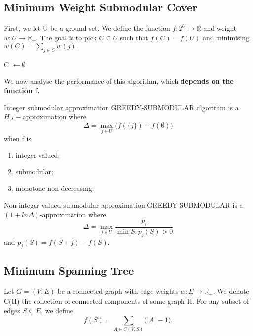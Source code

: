 \documentclass[twoside]{article}
\begin{document}
\subsection{Minimum Weight Submodular Cover}
First, we let U be a ground set. We define the function $f: 2^U \rightarrow \mathbb{R}$ and weight $w: U \rightarrow \mathbb{R}_{+}$. The goal is to pick $C \subseteq U$ such that $f(C) = f(U)$ and minimising $w(C) = \sum_{j \in C}w(j).$
\begin{algorithm}
\DontPrintSemicolon
{}
C $\gets \emptyset$\;

\;
\caption{{\sc GREEDY SUBMODULAR Algorithm}}
\label{algo:duplicate}
\end{algorithm}

We now analyse the performance of this algorithm, which \textbf{depends on the function f.}

\begin{theorem_exam}{Integer submodular approximation}{} GREEDY-SUBMODULAR algorithm is a $H_{\Delta}-$approximation where 
$$
\Delta = \max_{j \in U}\bigg(f(\{j\}) - f(\emptyset) \bigg)
$$
when f is 
\begin{enumerate}
\item integer-valued;
\item submodular;
\item monotone non-decreasing.
\end{enumerate}
\end{theorem_exam}

\begin{theorem_exam}{Non-integer valued submodular approximation}{} GREEDY-SUBMODULAR is a $(1 + ln \Delta)$-approximation where 
$$
\Delta = \max_{j \in U}\frac{p_j}{\min S: p_j(S) > 0}
$$
and $p_j(S) = f(S+j) - f(S).$
\end{theorem_exam}

\subsection{Minimum Spanning Tree}
Let $G = (V,E)$ be a connected graph with edge weights $w: E \rightarrow \mathbb{R}_{+}.$ We denote C(H) the collection of connected components of some graph H. For any subset of edges $S \subseteq E$, we define 
$$
f(S) = \sum_{A \in C(V,S)}\bigg(|A| - 1 \bigg).
$$
\end{document}
